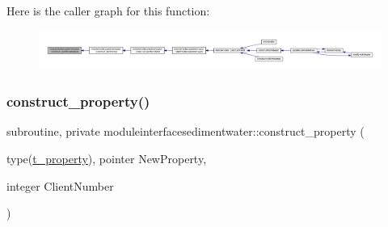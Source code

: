 Here is the caller graph for this function\+:\nopagebreak
\begin{figure}[H]
\begin{center}
\leavevmode
\includegraphics[width=350pt]{namespacemoduleinterfacesedimentwater_a6172f96194c964b013cd855127df7b8d_icgraph}
\end{center}
\end{figure}
\mbox{\label{namespacemoduleinterfacesedimentwater_a7388cf4b98f85f5b8bc80f3e59724650}} 
\subsubsection{\texorpdfstring{construct\+\_\+property()}{construct\_property()}}
{\footnotesize\ttfamily subroutine, private moduleinterfacesedimentwater\+::construct\+\_\+property (\begin{DoxyParamCaption}\item[{type(\mbox{\hyperlink{structmoduleinterfacesedimentwater_1_1t__property}{t\+\_\+property}}), pointer}]{New\+Property,  }\item[{integer}]{Client\+Number }\end{DoxyParamCaption})\hspace{0.3cm}{\ttfamily [private]}}

